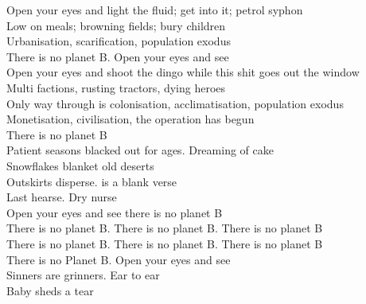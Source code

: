 \label{album:infest-the-rats-nest}




Open your eyes and light the fluid; get into it; petrol syphon \\
Low on meals; browning fields; bury children \\
Urbanisation, scarification, population exodus \\
There is no planet B. Open your eyes and see \\

Open your eyes and shoot the dingo while this shit goes out the window \\
Multi factions, rusting tractors, dying heroes \\

Only way through is colonisation, acclimatisation, population exodus \\
Monetisation, civilisation, the operation has begun \\
There is no planet B \\

Patient seasons blacked out for ages. Dreaming of cake \\
Snowflakes blanket old deserts \\
Outskirts disperse.  is a blank verse \\
Last hearse. Dry nurse \\

Open your eyes and see there is no planet B \\
There is no planet B. There is no planet B. There is no planet B \\
There is no planet B. There is no planet B. There is no planet B \\
There is no Planet B. Open your eyes and see \\

Sinners are grinners. Ear to ear \\
Baby  sheds a tear \\




